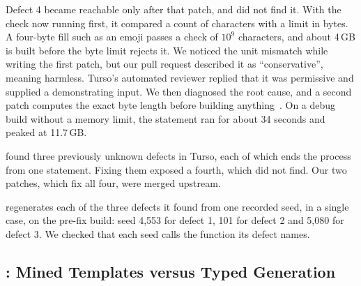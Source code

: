Defect 4 became reachable only after that patch, and \tool did not find it. With
the check now running first, it compared a count of characters with a limit in
bytes. A four-byte fill such as an emoji passes a check of $10^9$ characters, and
about 4\,GB is built before the byte limit rejects it. We noticed the unit
mismatch while writing the first patch, but our pull request described it as
``conservative'', meaning harmless. Turso's automated reviewer replied that it
was permissive and supplied a demonstrating input. We then diagnosed the root
cause, and a second patch computes the exact byte length before building
anything~\cite{turso11260,turso11259}. On a debug build without a memory limit,
the statement ran for about 34 seconds and peaked at 11.7\,GB.

\begin{observation}
\label{obs:found}
\tool found three previously unknown defects in Turso, each of which ends the
process from one statement. Fixing them exposed a fourth, which \tool did not
find. Our two patches, which fix all four, were merged upstream.
\end{observation}

\begin{observation}
\label{obs:seed}
\tool regenerates each of the three defects it found from one recorded seed, in
a single case, on the pre-fix build: seed 4{,}553 for defect 1, 101 for defect 2
and 5{,}080 for defect 3. We checked that each seed calls the function its
defect names.
\end{observation}

\subsection{: Mined Templates versus Typed Generation}
\label{sec:rq2}

